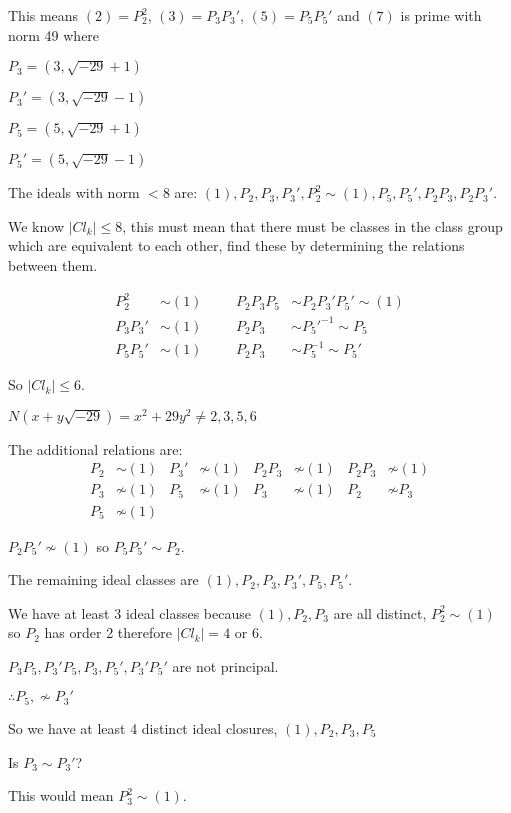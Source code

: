 \documentclass[11pt]{article}
\begin{document}
This means $(2) = P_2^2$, $(3) = P_3P_3'$, $(5) = P_5P_5'$ and $(7)$ is prime with norm 49 where 

$P_3 = (3,\sqrt{-29}+ 1)$ 

$P_3' = (3, \sqrt{-29} -1)$

$P_5 = (5,\sqrt{-29}+ 1)$ 

$P_5' = (5,\sqrt{-29}-1)$



The ideals with norm $<8$ are: $ (1), P_2, P_3, P_3', P_2^2 \sim (1), P_5, P_5', P_2P_3, P_2P_3'$.

We know $|Cl_k| \leq 8$, this must mean that there must be classes in the class group which are equivalent to each other, find these by determining the relations between them.

\begin{align*}
	P_2^2 &\sim (1) &&& P_2P_3P_5 &\sim P_2P_3'P_5' \sim (1)\\
	P_3P_3' &\sim (1) &&& P_2P_3 &\sim P_5'^{-1} \sim P_5 \\
	P_5P_5'&\sim (1)  &&& P_2P_3 &\sim P_5^{-1} \sim P_5'
\end{align*}

So $|Cl_k| \leq 6$.
\spa

$N(x+y\sqrt{-29}) = x^2+29y^2 \neq 2,3,5,6$ 

The additional relations are:
\begin{align*}
	P_2 &\sim (1)& P_3' &\not \sim (1)  & P_2P_3 &\not \sim (1)  &P_2P_3 &\not \sim (1) \\
	P_3 & \not \sim (1) & P_5 & \not \sim(1) & P_3 &\not \sim (1) & P_2 &\not \sim P_3\\
	P_5 &\not \sim (1) 
\end{align*}

$P_2P_5' \not \sim (1) $ so $P_5P_5' \sim P_2$.
\spa

The remaining ideal classes are $(1), P_2, P_3, P_3', P_5, P_5' $.

We have at least 3 ideal classes because $(1), P_2, P_3$ are all distinct, $P_2^2 \sim (1) $ so $P_2$ has order 2 therefore $|Cl_k| =4$ or $6$.
\spa

$P_3P_5, P_3'P_5, P_3,P_5', P_3'P_5'$ are not principal.
\spa

$\therefore P_5, \not \sim P_3'$
\spa

So we have at least 4 distinct ideal closures, $(1), P_2, P_3, P_5$

Is $P_3 \sim P_3' $?

This would mean $P_3^2 \sim (1)$.
\spa
\end{document}
